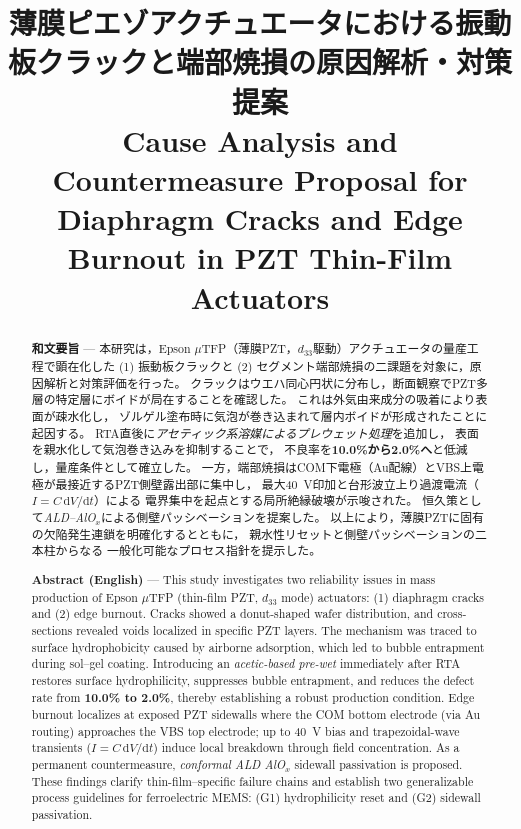 \documentclass[conference]{IEEEtran}
\title{%
  薄膜ピエゾアクチュエータにおける振動板クラックと端部焼損の原因解析・対策提案\\
  \large Cause Analysis and Countermeasure Proposal for Diaphragm Cracks and Edge Burnout in PZT Thin-Film Actuators
}
\author{%
  \IEEEauthorblockN{三溝 真一 (Shinichi Samizo)}%
  \IEEEauthorblockA{独立系半導体研究者（元セイコーエプソン） / Independent Semiconductor Researcher (ex-Seiko Epson)\\%
  Email: \href{mailto:shin3t72@gmail.com}{shin3t72@gmail.com}\quad
  GitHub: \url{https://github.com/Samizo-AITL}}%
}
\begin{document}
\maketitle

\begin{abstract}
\textbf{和文要旨} —
本研究は，Epson $\mu$TFP（薄膜PZT，$d_{33}$駆動）アクチュエータの量産工程で顕在化した
(1) 振動板クラックと (2) セグメント端部焼損の二課題を対象に，原因解析と対策評価を行った。
クラックはウエハ同心円状に分布し，断面観察でPZT多層の特定層にボイドが局在することを確認した。
これは外気由来成分の吸着により表面が疎水化し，
ゾルゲル塗布時に気泡が巻き込まれて層内ボイドが形成されたことに起因する。
RTA直後に\emph{アセティック系溶媒によるプレウェット処理}を追加し，
表面を親水化して気泡巻き込みを抑制することで，
不良率を\textbf{10.0\%から2.0\%へ}と低減し，量産条件として確立した。
一方，端部焼損はCOM下電極（Au配線）とVBS上電極が最接近するPZT側壁露出部に集中し，
最大\SI{40}{V}印加と台形波立上り過渡電流（$I=C\,\mathrm{d}V/\mathrm{d}t$）による
電界集中を起点とする局所絶縁破壊が示唆された。
恒久策として\emph{ALD–AlO$_x$}による側壁パッシベーションを提案した。
以上により，薄膜PZTに固有の欠陥発生連鎖を明確化するとともに，
親水性リセットと側壁パッシベーションの二本柱からなる
一般化可能なプロセス指針を提示した。

\medskip
\textbf{Abstract (English)} —
This study investigates two reliability issues in mass production of Epson $\mu$TFP
(thin-film PZT, $d_{33}$ mode) actuators: (1) diaphragm cracks and (2) edge burnout.
Cracks showed a donut-shaped wafer distribution, and cross-sections revealed voids localized
in specific PZT layers. The mechanism was traced to surface hydrophobicity caused by
airborne adsorption, which led to bubble entrapment during sol–gel coating.
Introducing an \emph{acetic-based pre-wet} immediately after RTA restores surface hydrophilicity,
suppresses bubble entrapment, and reduces the defect rate from \textbf{10.0\% to 2.0\%},
thereby establishing a robust production condition.
Edge burnout localizes at exposed PZT sidewalls where the COM bottom electrode
(via Au routing) approaches the VBS top electrode; up to \SI{40}{V} bias and trapezoidal-wave
transients ($I=C\,\mathrm{d}V/\mathrm{d}t$) induce local breakdown through field concentration.
As a permanent countermeasure, \emph{conformal ALD AlO$_x$} sidewall passivation is proposed.
These findings clarify thin-film–specific failure chains and establish two generalizable
process guidelines for ferroelectric MEMS: (G1) hydrophilicity reset and (G2) sidewall passivation.
\end{abstract}
\end{document}
